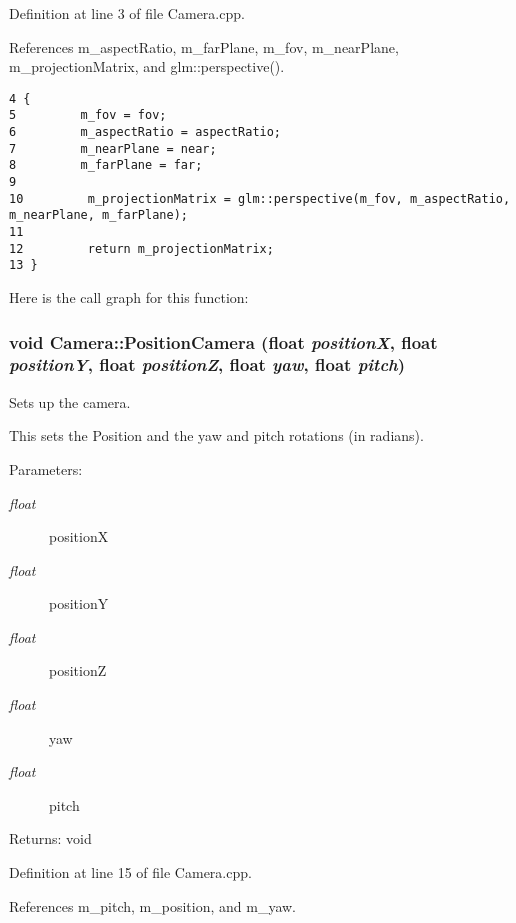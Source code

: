 Definition at line 3 of file Camera.cpp.

References m\_\-aspectRatio, m\_\-farPlane, m\_\-fov, m\_\-nearPlane, m\_\-projectionMatrix, and glm::perspective().

\begin{Code}\begin{verbatim}4 {
5         m_fov = fov;
6         m_aspectRatio = aspectRatio;
7         m_nearPlane = near;
8         m_farPlane = far;
9 
10         m_projectionMatrix = glm::perspective(m_fov, m_aspectRatio, m_nearPlane, m_farPlane);
11 
12         return m_projectionMatrix;
13 }
\end{verbatim}
\end{Code}




Here is the call graph for this function:\hypertarget{class_camera_e32a72f519739a0b4dce07433cfbe9ef}{
\subsubsection[PositionCamera]{\setlength{\rightskip}{0pt plus 5cm}void Camera::PositionCamera (float {\em positionX}, \/  float {\em positionY}, \/  float {\em positionZ}, \/  float {\em yaw}, \/  float {\em pitch})}}
\label{class_camera_e32a72f519739a0b4dce07433cfbe9ef}


Sets up the camera. 

This sets the Position and the yaw and pitch rotations (in radians).

\begin{Desc}
\item[Parameters:]
\begin{description}
\item[{\em float}]positionX \item[{\em float}]positionY \item[{\em float}]positionZ \item[{\em float}]yaw \item[{\em float}]pitch \end{description}
\end{Desc}
\begin{Desc}
\item[Returns:]void \end{Desc}


Definition at line 15 of file Camera.cpp.

References m\_\-pitch, m\_\-position, and m\_\-yaw.

